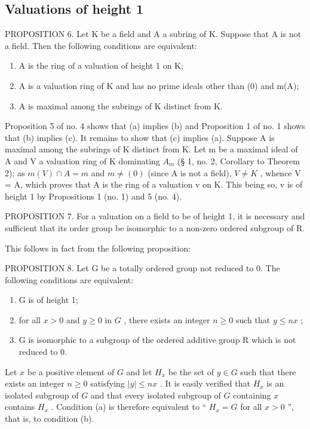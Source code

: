 \subsection{Valuations of height 1}

PROPOSITION 6. Let K be a field and A a subring of K. Suppose that A is not a field. Then the following conditions are equivalent:

\begin{enumerate}
\def\labelenumi{(\alph{enumi})}
\item
  A is the ring of a valuation of height 1 on K;
\item
  A is a valuation ring of K and has no prime ideals other than (0) and m(A);
\item
  A is maximal among the subrings of K distinct from K.
\end{enumerate}

Proposition 5 of no. 4 shows that (a) implies (b) and Proposition 1 of no. 1 shows that (b) implies (c). It remains to show that (c) implies (a). Suppose A is maximal among the subrings of K distinct from K. Let m be a maximal ideal of A and V a valuation ring of K dominating \(A_{m}\) (§ 1, no. 2, Corollary to Theorem 2); as \(m(V) \cap A = m\) and \(m \neq (0)\) (since A is not a field), \(V \neq K\) , whence V = A, which proves that A is the ring of a valuation v on K. This being so, v is of height 1 by Propositions 1 (no. 1) and 5 (no. 4).

PROPOSITION 7. For a valuation on a field to be of height 1, it is necessary and sufficient that its order group be isomorphic to a non-zero ordered subgroup of R.

This follows in fact from the following proposition:

PROPOSITION 8. Let G be a totally ordered group not reduced to 0. The following conditions are equivalent:

\begin{enumerate}
\def\labelenumi{(\alph{enumi})}
\item
  G is of height 1;
\item
  for all \(x > 0\) and \(y \geqslant 0\) in \(G\) , there exists an integer \(n \geqslant 0\) such that \(y \leqslant nx\) ;
\item
  G is isomorphic to a subgroup of the ordered additive group R which is not reduced to 0.
\end{enumerate}

Let \(x\) be a positive element of \(G\) and let \(H_x\) be the set of \(y \in G\) such that there exists an integer \(n \geqslant 0\) satisfying \(|y| \leqslant nx\) . It is easily verified that \(H_x\) is an isolated subgroup of \(G\) and that every isolated subgroup of \(G\) containing \(x\) contains \(H_x\) . Condition (a) is therefore equivalent to `` \(H_x = G\) for all \(x > 0\) '', that is, to condition (b).

